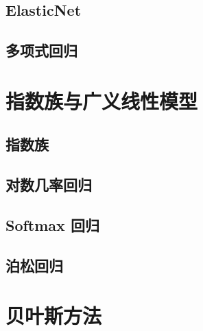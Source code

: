 


\subsection{ElasticNet} %
\label{sub:elasticnet}


\subsection{多项式回归} %
\label{sub:多项式回归}



\section{指数族与广义线性模型} %
\label{sec:指数族与广义线性模型}
\subsection{指数族} %
\label{sub:指数族}

\subsection{对数几率回归} %
\label{sub:对数几率回归}


\subsection{Softmax 回归} %
\label{sub:softmax_回归}


\subsection{泊松回归} %
\label{sub:泊松回归}



\section{贝叶斯方法} %
\label{sec:贝叶斯方法}

